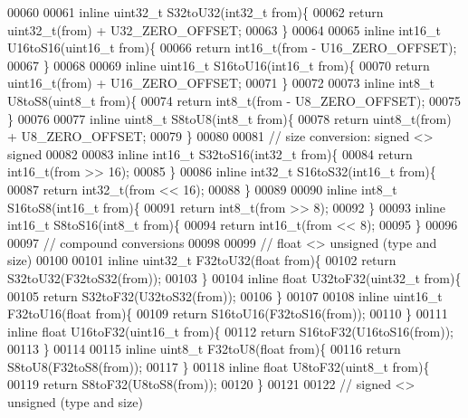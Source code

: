 \begin{DoxyCode}
00060 
00061 \textcolor{keyword}{inline} uint32\_t S32toU32(int32\_t from)\{
00062   \textcolor{keywordflow}{return} uint32\_t(from) + U32_ZERO_OFFSET;
00063 \}
00064 
00065 \textcolor{keyword}{inline} int16\_t U16toS16(uint16\_t from)\{
00066   \textcolor{keywordflow}{return} int16\_t(from - U16\_ZERO\_OFFSET);
00067 \}
00068 
00069 \textcolor{keyword}{inline} uint16\_t S16toU16(int16\_t from)\{
00070   \textcolor{keywordflow}{return} uint16\_t(from) + U16_ZERO_OFFSET;
00071 \}
00072 
00073 \textcolor{keyword}{inline} int8\_t U8toS8(uint8\_t from)\{
00074   \textcolor{keywordflow}{return} int8\_t(from - U8\_ZERO\_OFFSET);
00075 \}
00076 
00077 \textcolor{keyword}{inline} uint8\_t S8toU8(int8\_t from)\{
00078   \textcolor{keywordflow}{return} uint8\_t(from) + U8_ZERO_OFFSET;
00079 \}
00080 
00081 \textcolor{comment}{// size conversion: signed <> signed}
00082 
00083 \textcolor{keyword}{inline} int16\_t S32toS16(int32\_t from)\{
00084   \textcolor{keywordflow}{return} int16\_t(from >> 16);
00085 \}
00086 \textcolor{keyword}{inline} int32\_t S16toS32(int16\_t from)\{
00087   \textcolor{keywordflow}{return} int32\_t(from << 16);
00088 \}
00089 
00090 \textcolor{keyword}{inline} int8\_t S16toS8(int16\_t from)\{
00091   \textcolor{keywordflow}{return} int8\_t(from >> 8);
00092 \}
00093 \textcolor{keyword}{inline} int16\_t S8toS16(int8\_t from)\{
00094   \textcolor{keywordflow}{return} int16\_t(from << 8);
00095 \}
00096 
00097 \textcolor{comment}{// compound conversions}
00098 
00099 \textcolor{comment}{// float <> unsigned (type and size)}
00100 
00101 \textcolor{keyword}{inline} uint32\_t F32toU32(\textcolor{keywordtype}{float} from)\{
00102   \textcolor{keywordflow}{return} S32toU32(F32toS32(from));
00103 \}
00104 \textcolor{keyword}{inline} \textcolor{keywordtype}{float} U32toF32(uint32\_t from)\{
00105   \textcolor{keywordflow}{return} S32toF32(U32toS32(from));
00106 \}
00107 
00108 \textcolor{keyword}{inline} uint16\_t F32toU16(\textcolor{keywordtype}{float} from)\{
00109   \textcolor{keywordflow}{return} S16toU16(F32toS16(from));
00110 \}
00111 \textcolor{keyword}{inline} \textcolor{keywordtype}{float} U16toF32(uint16\_t from)\{
00112   \textcolor{keywordflow}{return} S16toF32(U16toS16(from));
00113 \}
00114 
00115 \textcolor{keyword}{inline} uint8\_t F32toU8(\textcolor{keywordtype}{float} from)\{
00116   \textcolor{keywordflow}{return} S8toU8(F32toS8(from));
00117 \}
00118 \textcolor{keyword}{inline} \textcolor{keywordtype}{float} U8toF32(uint8\_t from)\{
00119   \textcolor{keywordflow}{return} S8toF32(U8toS8(from));
00120 \}
00121 
00122 \textcolor{comment}{// signed <> unsigned (type and size)}

\end{DoxyCode}
